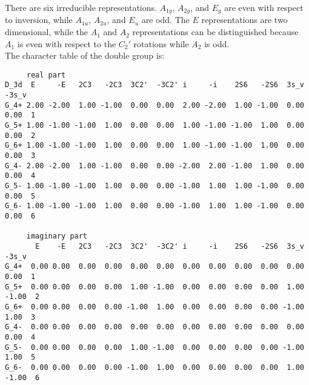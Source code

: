 \documentclass[12pt,a4paper,twoside]{report}
\begin{document}
There are six irreducible representations. $A_{1g}$, $A_{2g}$, and $E_g$
are even with respect to inversion, while $A_{1u}$, $A_{2u}$, and $E_u$ are
odd. The $E$ representations are two dimensional, while the $A_1$ and $A_2$
representations can be distinguished because $A_1$ is even with
respect to the $C_2'$ rotations while $A_2$ is odd. \\
The character table of the double group is:

\begin{tcolorbox}
\begin{scriptsize}
\begin{verbatim}
     real part
D_3d  E     -E   2C3   -2C3  3C2'  -3C2' i     -i    2S6   -2S6  3s_v  -3s_v
G_4+ 2.00 -2.00  1.00 -1.00  0.00  0.00  2.00 -2.00  1.00 -1.00  0.00  0.00  1
G_5+ 1.00 -1.00 -1.00  1.00  0.00  0.00  1.00 -1.00 -1.00  1.00  0.00  0.00  2
G_6+ 1.00 -1.00 -1.00  1.00  0.00  0.00  1.00 -1.00 -1.00  1.00  0.00  0.00  3
G_4- 2.00 -2.00  1.00 -1.00  0.00  0.00 -2.00  2.00 -1.00  1.00  0.00  0.00  4 
G_5- 1.00 -1.00 -1.00  1.00  0.00  0.00 -1.00  1.00  1.00 -1.00  0.00  0.00  5
G_6- 1.00 -1.00 -1.00  1.00  0.00  0.00 -1.00  1.00  1.00 -1.00  0.00  0.00  6

     imaginary part
       E    -E   2C3   -2C3  3C2'  -3C2' i     -i    2S6   -2S6  3s_v  -3s_v
G_4+  0.00 0.00  0.00  0.00  0.00  0.00  0.00  0.00  0.00  0.00  0.00  0.00  1
G_5+  0.00 0.00  0.00  0.00  1.00 -1.00  0.00  0.00  0.00  0.00  1.00 -1.00  2
G_6+  0.00 0.00  0.00  0.00 -1.00  1.00  0.00  0.00  0.00  0.00 -1.00  1.00  3
G_4-  0.00 0.00  0.00  0.00  0.00  0.00  0.00  0.00  0.00  0.00  0.00  0.00  4
G_5-  0.00 0.00  0.00  0.00  1.00 -1.00  0.00  0.00  0.00  0.00 -1.00  1.00  5
G_6-  0.00 0.00  0.00  0.00 -1.00  1.00  0.00  0.00  0.00  0.00  1.00 -1.00  6
\end{verbatim}
\end{scriptsize}
\end{tcolorbox}
\end{document}
